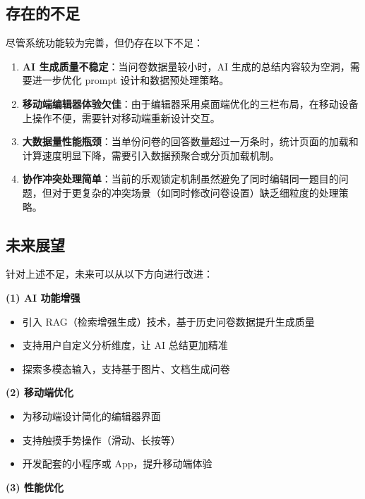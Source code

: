 \subsection{存在的不足}

尽管系统功能较为完善，但仍存在以下不足：

\begin{enumerate}[label=(\arabic*)]
  \item \textbf{AI 生成质量不稳定}：当问卷数据量较小时，AI 生成的总结内容较为空洞，需要进一步优化 prompt 设计和数据预处理策略。
  
  \item \textbf{移动端编辑器体验欠佳}：由于编辑器采用桌面端优化的三栏布局，在移动设备上操作不便，需要针对移动端重新设计交互。
  
  \item \textbf{大数据量性能瓶颈}：当单份问卷的回答数量超过一万条时，统计页面的加载和计算速度明显下降，需要引入数据预聚合或分页加载机制。
  
  \item \textbf{协作冲突处理简单}：当前的乐观锁定机制虽然避免了同时编辑同一题目的问题，但对于更复杂的冲突场景（如同时修改问卷设置）缺乏细粒度的处理策略。
\end{enumerate}

\subsection{未来展望}

针对上述不足，未来可以从以下方向进行改进：

\textbf{(1) AI 功能增强}

\begin{itemize}
  \item 引入 RAG（检索增强生成）技术，基于历史问卷数据提升生成质量
  \item 支持用户自定义分析维度，让 AI 总结更加精准
  \item 探索多模态输入，支持基于图片、文档生成问卷
\end{itemize}

\textbf{(2) 移动端优化}

\begin{itemize}
  \item 为移动端设计简化的编辑器界面
  \item 支持触摸手势操作（滑动、长按等）
  \item 开发配套的小程序或 App，提升移动端体验
\end{itemize}

\textbf{(3) 性能优化}

